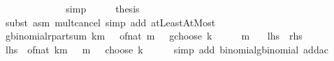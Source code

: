 \begin{isabellebody}
\ {\isachardoublequoteopen}{\isasymdots}\ {\isacharplus}{\kern0pt}\ {\isasymdots}\ {\isacharequal}{\kern0pt}\ {}\ {\isacharasterisk}{\kern0pt}\ {\isasymdots}{\isachardoublequoteclose}\isanewline
\ \ \ \ \isamarkupfalse%
\ simp\isanewline
\ \ \isamarkupfalse%
\ \isamarkupfalse%
\ {\isacharquery}{\kern0pt}thesis\isanewline
\ \ \ \ \isamarkupfalse%
\ {\isacharparenleft}{\kern0pt}subst\ {\isacharparenleft}{\kern0pt}asm{\isacharparenright}{\kern0pt}\ mult{\isacharunderscore}{\kern0pt}cancel{}{\isacharparenright}{\kern0pt}\ {\isacharparenleft}{\kern0pt}simp\ add{\isacharcolon}{\kern0pt}\ atLeast{}AtMost{\isacharparenright}{\kern0pt}\isanewline
{}\isamarkupfalse%
%
\endisatagproof
{\isafoldproof}%
%
\isadelimproof
\isanewline
%
\endisadelimproof
\isanewline
{}\isamarkupfalse%
\ gbinomial{\isacharunderscore}{\kern0pt}r{\isacharunderscore}{\kern0pt}part{\isacharunderscore}{\kern0pt}sum{\isacharcolon}{\kern0pt}\ {\isachardoublequoteopen}{\isacharparenleft}{\kern0pt}{\isasymSum}k{\isasymle}m{\isachardot}{\kern0pt}\ {\isacharparenleft}{\kern0pt}{}\ {\isacharasterisk}{\kern0pt}\ {\isacharparenleft}{\kern0pt}of{\isacharunderscore}{\kern0pt}nat\ m{\isacharparenright}{\kern0pt}\ {\isacharplus}{\kern0pt}\ {}\ gchoose\ k{\isacharparenright}{\kern0pt}{\isacharparenright}{\kern0pt}\ {\isacharequal}{\kern0pt}\ {}\ {\isacharcircum}{\kern0pt}\ {\isacharparenleft}{\kern0pt}{}\ {\isacharasterisk}{\kern0pt}\ m{\isacharparenright}{\kern0pt}{\isachardoublequoteclose}\isanewline
\ \ {\isacharparenleft}{\kern0pt}\ {\isachardoublequoteopen}{\isacharquery}{\kern0pt}lhs\ {\isacharequal}{\kern0pt}\ {\isacharquery}{\kern0pt}rhs{\isachardoublequoteclose}{\isacharparenright}{\kern0pt}\isanewline
%
\isadelimproof
%
\endisadelimproof
%
\isatagproof
{}\isamarkupfalse%
\ {\isacharminus}{\kern0pt}\isanewline
\ \ \isamarkupfalse%
\ {\isachardoublequoteopen}{\isacharquery}{\kern0pt}lhs\ {\isacharequal}{\kern0pt}\ of{\isacharunderscore}{\kern0pt}nat\ {\isacharparenleft}{\kern0pt}{\isasymSum}k{\isasymle}m{\isachardot}{\kern0pt}\ {\isacharparenleft}{\kern0pt}{}\ {\isacharasterisk}{\kern0pt}\ m\ {\isacharplus}{\kern0pt}\ {}{\isacharparenright}{\kern0pt}\ choose\ k{\isacharparenright}{\kern0pt}{\isachardoublequoteclose}\isanewline
\ \ \ \ \isamarkupfalse%
\ {\isacharparenleft}{\kern0pt}simp\ add{\isacharcolon}{\kern0pt}\ binomial{\isacharunderscore}{\kern0pt}gbinomial\ add{\isacharunderscore}{\kern0pt}ac{\isacharparenright}{\kern0pt}\isanewline

\end{isabellebody}

